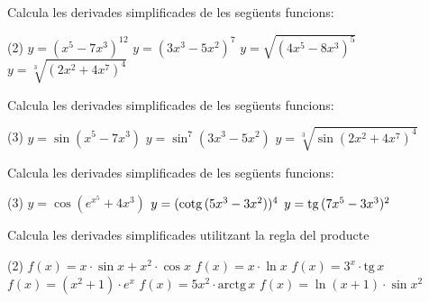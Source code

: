 \begin{mylist}
	
 
\exer  Calcula les derivades simplificades de les següents funcions:

\begin{tasks}(2)
	\task $y = (x^5 - 7x^3)^{12}$  \task $y = (3x^3 - 5x^2)^7$  \task $y=\sqrt{\left(4x^{5} -8x^{3} \right)^{5} } $    \task $y=\sqrt[{3}]{\left(2x^{2} +4x^{7} \right)^{4} } $
\end{tasks} 

\answers{[$y' = 12(x^5 - 7x^3)^{11} (5x^4-21x^2)$, $y' = 7(3x^3 - 5x^2)^6 (9x^2-10x)$, $y=\dfrac{1}{2\sqrt{\left(4x^{5} -8x^{3} \right)^{5} }} \cdot 5 \left(4x^{5} -8x^{3} \right)^{4} \cdot (20 x^4 - 24x^2) $, $y'=\dfrac{4}{3}\sqrt[{3}]{\left( 2x^{2} +4x^{7} \right) } \cdot (4x+28x^6) $]}
	
\exer  Calcula les derivades simplificades de les següents funcions:

\begin{tasks}(3)
	\task $y = \sin(x^5 - 7x^3)$ 
	\task  $y = \sin^7(3x^3 - 5x^2)$   
	\task  $y=\sqrt[{3}]{\sin\left(2x^{2} +4x^{7} \right)^{4} } $
\end{tasks}

\answers{[$y' = (5x^4-21 x^2) \cos(x^5 - 7x^3)$,   $y' = 7 \sin^6(3x^3 - 5x^2) \cdot \cos(3x^3 - 5x^2) \cdot (9x^2-10x)$,
	  $y'=-\dfrac{4(2x^{2} +4x^{7})^3 (4x+28x^6) \cos  \left(2x^{2} +4x^{7} \right)^{4} }{\sqrt[{3}]{\sin^2  \left(2x^{2} +4x^{7} \right)^{4} } }$ ]}

\exer  Calcula les derivades simplificades de les següents funcions:

\begin{tasks}(3)
	\task  $y = \cos(e^{x^5} + 4x^3)$   \task  $y = (\mathrm{cotg}\,(5x^3 - 3x^2))^4$
	\task  $y = \mathrm{tg}\,(7x^5 - 3x^3)^2$   
\end{tasks}

\answers{[ $y' = -(5x^4 e^{x^5}+12x^2) \sin(e^{x^5} + 4x^3)$,  $y' = -4(\cotg(5x^3 - 3x^2))^3 \cdot \dfrac{15x^2-6x}{\sin^2(5x^3 - 3x^2)}$,
  $y' = \left[ 1+\tg^2(7x^5 - 3x^3)^2 \right] \cdot 2 (7x^5-3x^3)\cdot (35x^4-9x^2)$ ]}

\exer[1] Calcula les derivades simplificades  utilitzant la regla del producte

\begin{tasks}(2)
	\task $f(x)=x\cdot \sin x + x^2\cdot \cos x$
	\task $f(x)=x\cdot \ln x$
	\task $f(x)=3^x\cdot \mathrm{tg}\, x $
	\task $f(x)=(x^2+1)\cdot e^x$
	\task $f(x)=5x^2\cdot \mathrm{arctg}\, x$
	\task $f(x)= \ln (x+1) \cdot \sin x^2$
\end{tasks}
\answers[cols=1]{[$y'=(1-x^2)\sin x+3x\cos x$, $y'=\ln x +1$, $y'=3^x \left( \tg^2 x + \ln 3 \tg x + 1 \right)$, $y'=(x+1)^2 e^x$, $y'=10x\,\arctg x + \dfrac{5x^2}{1+x^2}$, $y'=\dfrac{\sin x^2}{x+1} + 2x\ln x\cos x^2$]}


\end{mylist}

